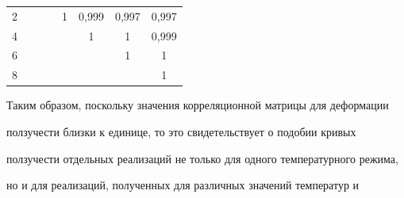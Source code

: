 \begin{table}[h!]
\begin{minipage}{.7\textwidth}
\begin{tabular}{c|ccccccc}
2&

&

&

&

1&

0,999&

0,997&

0,997 \\


4&

&

&

&

&

1&

1&

0,999 \\


6&

&

&

&

&

&

1&

1 \\


8&

&

&

&

&

&

&

1 \\

\hline

\end{tabular}

\label{tab1}

\end{minipage}

\vspace{-5mm}

\end{table}



Таким образом, поскольку значения корреляционной матрицы для деформации

ползучести близки к единице, то это свидетельствует о подобии кривых

ползучести отдельных реализаций не только для одного температурного режима,

но и для реализаций, полученных для различных значений температур и

